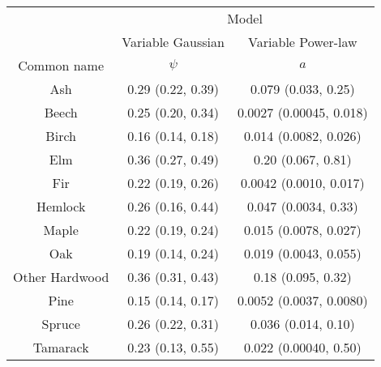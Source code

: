 \newpage
\begin{table}[H]
\begin{center}
\begin{tabular}{ccc} 
\toprule
               &   \multicolumn{2}{c}{Model} \\
               & Variable Gaussian           & Variable Power-law \\  \midrule
Common name    & $\psi$             & $a$         \\  \midrule
           Ash & 0.29 (0.22, 0.39)  & 0.079 (0.033, 0.25)    \\
         Beech & 0.25 (0.20, 0.34)  & 0.0027 (0.00045, 0.018)    \\
         Birch & 0.16 (0.14, 0.18)  & 0.014 (0.0082, 0.026)    \\
           Elm & 0.36 (0.27, 0.49)  & 0.20 (0.067, 0.81)    \\
           Fir & 0.22 (0.19, 0.26)  & 0.0042 (0.0010, 0.017)    \\
       Hemlock & 0.26 (0.16, 0.44)  & 0.047 (0.0034, 0.33)    \\
         Maple & 0.22 (0.19, 0.24)  & 0.015 (0.0078, 0.027)    \\
           Oak & 0.19 (0.14, 0.24)  & 0.019 (0.0043, 0.055)    \\
Other Hardwood & 0.36 (0.31, 0.43)  & 0.18 (0.095, 0.32)    \\
          Pine & 0.15 (0.14, 0.17)  & 0.0052 (0.0037, 0.0080)    \\
        Spruce & 0.26 (0.22, 0.31)  & 0.036 (0.014, 0.10)    \\
      Tamarack & 0.23 (0.13, 0.55)  & 0.022 (0.00040, 0.50)    \\ \bottomrule
\end{tabular}
\end{center}
\end{table}





